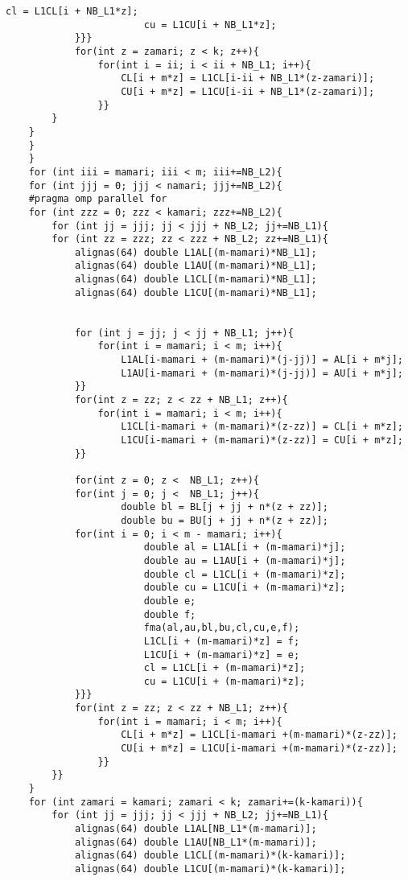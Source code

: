 \documentclass[11pt,a4paper]{jsreport}
\theoremstyle{definition}
\begin{document}
\begin{lstlisting}[caption = 本研究で使用したプログラム]
                        cl = L1CL[i + NB_L1*z];
                        cu = L1CU[i + NB_L1*z];
            }}}
            for(int z = zamari; z < k; z++){
                for(int i = ii; i < ii + NB_L1; i++){
                    CL[i + m*z] = L1CL[i-ii + NB_L1*(z-zamari)];
                    CU[i + m*z] = L1CU[i-ii + NB_L1*(z-zamari)];
                }}
        }
    }
    }
    }
    for (int iii = mamari; iii < m; iii+=NB_L2){
    for (int jjj = 0; jjj < namari; jjj+=NB_L2){ 
    #pragma omp parallel for
    for (int zzz = 0; zzz < kamari; zzz+=NB_L2){           
        for (int jj = jjj; jj < jjj + NB_L2; jj+=NB_L1){
        for (int zz = zzz; zz < zzz + NB_L2; zz+=NB_L1){
            alignas(64) double L1AL[(m-mamari)*NB_L1]; 
            alignas(64) double L1AU[(m-mamari)*NB_L1];
            alignas(64) double L1CL[(m-mamari)*NB_L1];
            alignas(64) double L1CU[(m-mamari)*NB_L1];


            for (int j = jj; j < jj + NB_L1; j++){
                for(int i = mamari; i < m; i++){
                    L1AL[i-mamari + (m-mamari)*(j-jj)] = AL[i + m*j];
                    L1AU[i-mamari + (m-mamari)*(j-jj)] = AU[i + m*j];
            }}
            for(int z = zz; z < zz + NB_L1; z++){
                for(int i = mamari; i < m; i++){
                    L1CL[i-mamari + (m-mamari)*(z-zz)] = CL[i + m*z];
                    L1CU[i-mamari + (m-mamari)*(z-zz)] = CU[i + m*z];
            }}
            
            for(int z = 0; z <  NB_L1; z++){
            for(int j = 0; j <  NB_L1; j++){
                    double bl = BL[j + jj + n*(z + zz)];
                    double bu = BU[j + jj + n*(z + zz)];
            for(int i = 0; i < m - mamari; i++){
                        double al = L1AL[i + (m-mamari)*j];
                        double au = L1AU[i + (m-mamari)*j];
                        double cl = L1CL[i + (m-mamari)*z];
                        double cu = L1CU[i + (m-mamari)*z];
                        double e;
                        double f;
                        fma(al,au,bl,bu,cl,cu,e,f);
                        L1CL[i + (m-mamari)*z] = f;
                        L1CU[i + (m-mamari)*z] = e;
                        cl = L1CL[i + (m-mamari)*z];
                        cu = L1CU[i + (m-mamari)*z];
            }}}
            for(int z = zz; z < zz + NB_L1; z++){
                for(int i = mamari; i < m; i++){
                    CL[i + m*z] = L1CL[i-mamari +(m-mamari)*(z-zz)];
                    CU[i + m*z] = L1CU[i-mamari +(m-mamari)*(z-zz)];
                }}
        }}
    }
    for (int zamari = kamari; zamari < k; zamari+=(k-kamari)){
        for (int jj = jjj; jj < jjj + NB_L2; jj+=NB_L1){
            alignas(64) double L1AL[NB_L1*(m-mamari)];
            alignas(64) double L1AU[NB_L1*(m-mamari)];
            alignas(64) double L1CL[(m-mamari)*(k-kamari)];
            alignas(64) double L1CU[(m-mamari)*(k-kamari)];



\end{lstlisting}
\end{document}
